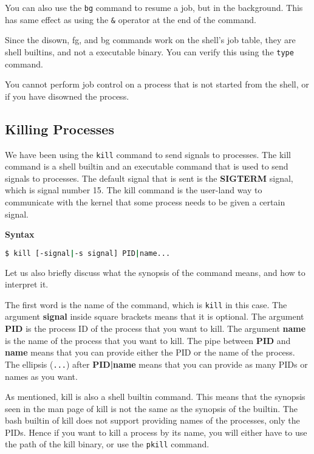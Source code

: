 You can also use the \lstinline|bg| command to resume a job, but in the background.
This has same effect as using the \lstinline|&| operator at the end of the command.

\begin{remark}
  Since the disown, fg, and bg commands work on the shell's job table,
  they are shell builtins, and not a executable binary.
  You can verify this using the \lstinline|type| command.
\end{remark}

You cannot perform job control on a process that is not started from the shell,
or if you have disowned the process.

\subsection{Killing Processes}

We have been using the \lstinline|kill| command to send signals to processes.
The kill command is a shell builtin and an executable command that is used
to send signals to processes. The default signal that is sent is the
\textbf{SIGTERM} signal, which is signal number 15.
The kill command is the user-land way to communicate with the kernel that
some process needs to be given a certain signal.

\textbf{Syntax}

\begin{lstlisting}[language=bash]
$ kill [-signal|-s signal] PID|name...
\end{lstlisting}

Let us also briefly discuss what the synopsis of the command means, and
how to interpret it.

The first word is the name of the command, which is \lstinline|kill| in this case.
The argument \textbf{signal} inside square brackets means that it is optional.
The argument \textbf{PID} is the process ID of the process that you want to kill.
The argument \textbf{name} is the name of the process that you want to kill.
The pipe between \textbf{PID} and \textbf{name} means that you can provide
either the PID or the name of the process.
The ellipsis (\lstinline|...|) after \textbf{PID|name} means that you can provide
as many PIDs or names as you want.

\begin{remark}
  As mentioned, kill is also a shell builtin command. This means that
  the synopsis seen in the man page of kill is not the same as the
  synopsis of the builtin. The bash builtin of kill does not support
  providing names of the processes, only the PIDs. Hence if you want
  to kill a process by its name, you will either have to use the
  path of the kill binary, or use the \lstinline|pkill| command.
\end{remark}

